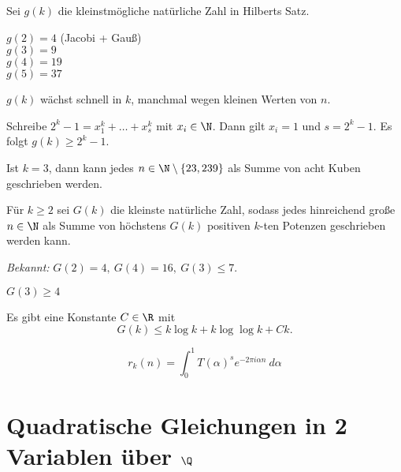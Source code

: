 \begin{defn*}
	Sei $g(k)$ die kleinstmögliche natürliche Zahl in Hilberts Satz.
\end{defn*}

\begin{exmp*}
	$g(2) = 4$ (Jacobi + Gauß)\\
	\( g(3) = 9 \)\\
	\( g(4) = 19 \)\\
	\( g(5) = 37 \)
\end{exmp*}

\begin{obs*}
	$g(k)$ wächst schnell in $k$, manchmal wegen kleinen Werten von $n$.
\end{obs*}

\begin{exmp*}
	Schreibe $2^k-1 = x_1^k + \dotsc + x_s^k$ mit $x_i \in \N$. Dann gilt $x_i = 1$ und $s = 2^k-1$. Es folgt $g(k) \geq 2^k-1$.
\end{exmp*}

\begin{idee*}
	Ist $k = 3$, dann kann jedes $n \in \N \setminus \{23,239\}$ als Summe von acht Kuben geschrieben werden.
\end{idee*}

\begin{defn*}
	Für $k \geq 2$ sei $G(k)$ die kleinste natürliche Zahl, sodass jedes hinreichend große $n \in \N$ als Summe von höchstens $G(k)$ positiven $k$-ten Potenzen geschrieben werden kann.
\end{defn*}

\emph{Bekannt:} $G(2) = 4,\ G(4) = 16,\ G(3) \leq 7$.

\begin{lem}\autolabel
	$G(3) \geq 4$
\end{lem}

\begin{thm*}
	Es gibt eine Konstante $C \in \R$ mit
	\[ G(k) \leq k \log k + k \log\log k + Ck. \]
\end{thm*}

\begin{lem*}
	\[ r_k(n) = \int_{0}^{1} T(\alpha)^s e^{-2\pi i \alpha n} \ d\alpha\]
\end{lem*}

\section{Quadratische Gleichungen in 2 Variablen über $\Q$}

